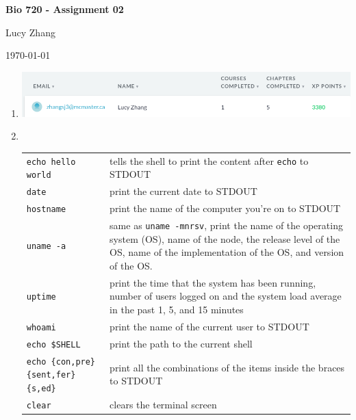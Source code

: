 \documentclass[12pt]{article}
\begin{document}
\begin{centering}
    \textbf{Bio 720 - Assignment 02}\par
    Lucy Zhang\par
    \today\par
\end{centering}                                           %

\begin{enumerate}
    \item \includegraphics[width=6.5in]{Screenshot_20180911_114301.png}
    \item ~\par
        {
            \renewcommand{\arraystretch}{1.5}
            \noindent \begin{longtable}{p{}p{}}
                \texttt{echo hello world} & tells the shell to print the content after \texttt{echo} to STDOUT\\
                \texttt{date}             & print the current date to STDOUT\\
                \texttt{hostname}         & print the name of the computer you're on to STDOUT\\
                \texttt{uname -a}         & same as \texttt{uname -mnrsv}, print the name of the operating system (OS), name of the node, the release level of the OS, name of the implementation of the OS, and version of the OS. \\
                \texttt{uptime}           & print the time that the system has been running, number of users logged on and the system load average in the past 1, 5, and 15 minutes\\
                \texttt{whoami}           & print the name of the current user to STDOUT\\
                \texttt{echo \$SHELL}     & print the path to the current shell\\
                \texttt{echo \{con,pre\}\{sent,fer\}\{s,ed\}} & print all the combinations of the items inside the braces to STDOUT\\
                \texttt{clear}            & clears the terminal screen \\

\end{longtable}}
\end{enumerate}
\end{document}

